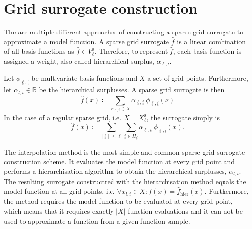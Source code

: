 \documentclass[
  a4paper,  %
  twoside,  %
  bibliography=totoc,
  headsepline,
  cleardoublepage=empty,
  parskip=half,
  draft=false
]{scrbook}
\begin{document}

\section{Grid surrogate construction}

The are multiple different approaches of constructing a sparse grid surrogate to approximate a model function.
A sparse grid surrogate $\hat{f}$ is a linear combination of all basis functions as $\hat{f} \in V^{\text{s}}_{\ell}$.
Therefore, to represent $\hat{f}$, each basis function is assigned a weight, also called hierarchical surplus, $\alpha_{\underline{\ell},\underline{i}}$.

\begin{definition}
Let $\phi_{\underline{\ell},\underline{i}}$ be multivariate basis functions and $X$ a set of grid points.
Furthermore, let $\alpha_{\underline{l},\underline{i}} \in \mathds{R}$ be the hierarchical surplusses.
A sparse grid surrogate is then
\begin{equation}
\hat{f}(x) \coloneqq \sum_{x_{\underline{\ell},\underline{i}} \in X} \alpha_{\underline{\ell},\underline{i}} ~ \phi_{
\underline{\ell},\underline{i}}(x)
\end{equation}
In the case of a regular sparse grid, i.e. $X=X^{\text{s}}_{\ell}$, the surrogate simply is
\begin{equation}
\hat{f}(x) \coloneqq \sum_{|\underline{\ell}|_1 \leq \ell} \sum_{\underline{i} \in {H_{\underline{\ell}}}} \alpha_{\underline{\ell},\underline{i}} ~ \phi_{
\underline{\ell},\underline{i}}(x).
\end{equation}
\end{definition}

The interpolation method is the most simple and common sparse grid surrogate construction scheme.
It evaluates the model function at every grid point and performs a hierarchisation algorithm \cite{} to obtain the hierarchical surplusses, $\alpha_{\underline{l},\underline{i}}$.
The resulting surrogate constructred with the hierarchisation method equals the model function at all grid points, i.e. $\forall x_{\underline{l},\underline{i}} \in X \colon f(x)=\hat{f}_{\text{hier}}(x)$.
Furthermore, the method requires the model function to be evaluated at every grid point, which means that it requires exactly $|X|$ function evaluations and it can not be used to approximate a function from a given function sample.
\end{document}
